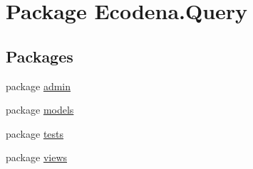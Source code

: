 \hypertarget{namespace_ecodena_1_1_query}{
\section{Package Ecodena.Query}
\label{dd/d6c/namespace_ecodena_1_1_query}
}
\subsection*{Packages}
\begin{DoxyCompactItemize}
\item 
package \hyperlink{namespace_ecodena_1_1_query_1_1admin}{admin}
\item 
package \hyperlink{namespace_ecodena_1_1_query_1_1models}{models}
\item 
package \hyperlink{namespace_ecodena_1_1_query_1_1tests}{tests}
\item 
package \hyperlink{namespace_ecodena_1_1_query_1_1views}{views}
\end{DoxyCompactItemize}
